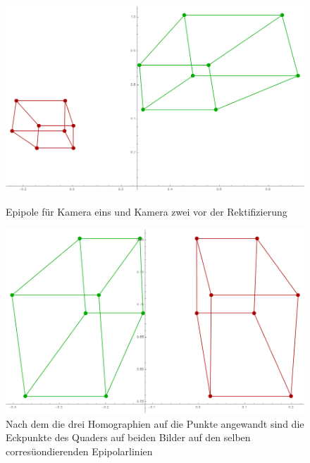 \begin{figure}[!htb]
	\includegraphics[width=\linewidth]{images/Rectification_Hp_different_Solutions.png}
	\caption{Epipole für Kamera eins und Kamera zwei vor der Rektifizierung}
	\endminipage\hfill
	\includegraphics[width=\linewidth]{images/Rectification_HrHp_different_Solutions.png}
	\caption{Nach dem die drei Homographien auf die Punkte angewandt sind die Eckpunkte des Quaders auf beiden Bilder auf den selben corresüondierenden Epipolarlinien}
	\endminipage\hfill
\end{figure}

